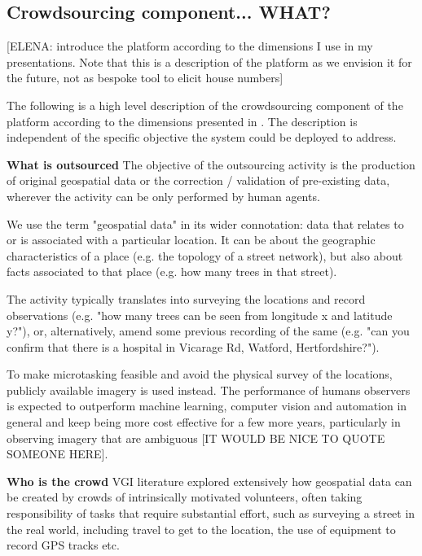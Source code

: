 \subsection{Crowdsourcing component... WHAT?}

[ELENA: introduce the platform according to the dimensions I use in my presentations. Note that this is a description of the platform as we envision it for the future, not as bespoke tool to elicit house numbers]

The following is a high level description of the crowdsourcing component of the platform according to the dimensions presented in \cite{Wearethedata:2015uo}. The description is independent of the specific objective the system could be deployed to address.

\textbf{What is outsourced} The objective of the outsourcing activity is the production of original geospatial data or the correction / validation of pre-existing data, wherever the activity can be only performed by human agents. 

We use the term "geospatial data" in its wider connotation: data that relates to or is associated with a particular location. It can be about the geographic characteristics of a place (e.g. the topology of a street network), but also about facts associated to that place (e.g. how many trees in that street).

The activity typically translates into surveying the locations and record observations (e.g. "how many trees can be seen from longitude x and latitude y?"), or, alternatively, amend some previous recording of the same (e.g. "can you confirm that there is a hospital in Vicarage Rd, Watford, Hertfordshire?"). 

To make microtasking feasible and avoid the physical survey of the locations, publicly available imagery is used instead. The performance of humans observers is expected to outperform machine learning, computer vision and automation in general and keep being more cost effective for a few more years, particularly in observing imagery that are ambiguous [IT WOULD BE NICE TO QUOTE SOMEONE HERE].

\textbf{Who is the crowd} VGI literature explored extensively how geospatial data can be created by crowds of intrinsically motivated volunteers, often taking responsibility of tasks that require substantial effort, such as surveying a street in the real world, including travel to get to the location, the use of equipment to record GPS tracks etc. 

